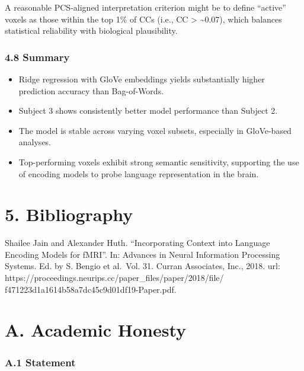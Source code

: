 \documentclass[11pt]{article}
\providecommand{\tightlist}{%
      \setlength{\itemsep}{0pt}\setlength{\parskip}{0pt}}
\begin{document}
A reasonable PCS-aligned interpretation criterion might be to define
``active'' voxels as those within the top 1\% of CCs (i.e., CC
\textgreater{} \textasciitilde0.07), which balances statistical
reliability with biological plausibility.

\hypertarget{summary}{%
\subsubsection{4.8 Summary}\label{summary}}

\begin{itemize}
\tightlist
\item
  Ridge regression with GloVe embeddings yields substantially higher
  prediction accuracy than Bag-of-Words.
\item
  Subject 3 shows consistently better model performance than Subject 2.
\item
  The model is stable across varying voxel subsets, especially in
  GloVe-based analyses.
\item
  Top-performing voxels exhibit strong semantic sensitivity, supporting
  the use of encoding models to probe language representation in the
  brain.
\end{itemize}

    \hypertarget{bibliography}{%
\section{5. Bibliography}\label{bibliography}}

Shailee Jain and Alexander Huth. ``Incorporating Context into Language
Encoding Models for fMRI''. In: Advances in Neural Information
Processing Systems. Ed. by S. Bengio et al.~Vol. 31. Curran Associates,
Inc., 2018. url:
https://proceedings.neurips.cc/paper\_files/paper/2018/file/
f471223d1a1614b58a7dc45c9d01df19-Paper.pdf.

    \hypertarget{a.-academic-honesty}{%
\section{A. Academic Honesty}\label{a.-academic-honesty}}

\hypertarget{a.1-statement}{%
\subsubsection{A.1 Statement}\label{a.1-statement}}
\end{document}
